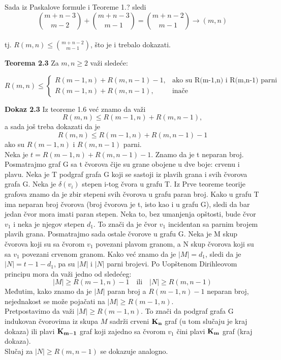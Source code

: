 \documentclass[12pt,a4paper]{article}
\begin{document}
	Sada iz Paskalove formule i Teoreme 1.? sledi 
	\[{m+n-3\choose m-2}+{m+n-3\choose m-1}={m+n-2\choose m-1}\rightarrow (m,n)\] 
	\\
	\vspace{0.7em} tj. $R(m,n) \leq {m+n-2\choose m-1}$, što je i trebalo dokazati. 
	
	{\noindent\fontsize{12pt}{12pt}\textbf{Teorema 2.3}}
	Za $m,n\geq 2$  važi sledeće:
	
	\[
   	 R(m,n)\leq 
		\begin{cases}
    		R(m-1,n)+R(m,n-1)-1,& \text{ako su R(m-1,n) i R(m,n-1) parni}\\
    	R(m-1,n)+R(m,n-1),      & \text{inače}
	\end{cases}
	\]
	
	{\noindent\fontsize{12pt}{12pt}\textbf{Dokaz 2.3}}
	Iz teoreme 1.6 već znamo da važi
	\[R(m,n)\leq R(m-1,n)+R(m,n-1),\]
	a sada još treba dokazati da je
	\[R(m,n)\leq R(m-1,n)+R(m,n-1)-1\] 
	ako su $R(m-1,n)$ i $R(m,n-1)$ parni.
	\vspace{0.5em}
	\\
	\noindent Neka je $t=R(m-1,n)+R(m,n-1)-1$.
	Znamo da je t neparan broj. Posmatrajmo graf G sa t čvorova čije su grane obojene u dve boje: crvenu i plavu. Neka je T podgraf grafa G koji se sastoji iz plavih grana i svih čvorova grafa G. Neka je $\delta(v_i)$ stepen i-tog čvora u grafu T. Iz Prve teoreme teorije grafova znamo da je zbir stepeni svih čvorova u grafu paran broj. Kako u grafu T ima neparan broj čvorova (broj čvorova je t, isto kao i u grafu G), sledi da bar jedan čvor mora imati paran stepen. Neka to, bez umanjenja opštosti, bude čvor $v_1$ i neka je njegov stepen $d_1$. To znači da je čvor $v_1$ incidentan sa parnim brojem plavih grana. Posmatrajmo sada ostale čvorove u grafu G. Neka je M skup čvorova koji su sa čvorom $v_1$ povezani plavom granom, a N skup čvorova koji su sa $v_1$ povezani crvenom granom. Kako već znamo da je $|M| = d_1$,  sledi da je $|N| = t-1-d_1$, pa su $|M|$ i $|N|$ parni brojevi. Po Uopštenom Dirihleovom principu mora da važi jedno od sledećeg:
	\[|M|\geq R(m-1,n)-1 \quad \text{ili} \quad  |N|\geq R(m,n-1)\] 
	Međutim, kako znamo da je $|M|$ paran broj a $R(m-1,n)-1$ neparan broj, nejednakost se može pojačati na $|M|\geq R(m-1,n)$. \\
	Pretpostavimo da važi $|M|\geq R(m-1,n)$. To znači da podgraf grafa G indukovan čvorovima iz skupa $M$ sadrži crveni $\bf K_n$ graf (u tom slučaju je kraj dokaza) ili plavi $\bf K_{m-1}$ graf koji zajedno sa čvorom $v_1$ čini plavi $\bf K_{m}$ graf (kraj dokaza).\\
	Slučaj za $|N|\geq R(m,n-1)$ se dokazuje analogno.\\
	
\end{document}
